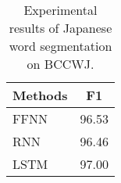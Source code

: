 \documentclass[11pt,letterpaper]{article}
\begin{document}
 \begin{table}[t]     
 
                                                                                                                                                                                                                                                                                                 
 \begin{center}                                                                                                                                                                                                                                                                                                             
\caption{Experimental results of Japanese word segmentation on BCCWJ.}                                                                                                                                                                                                                                                                                 
\label{state_result}                                                                                                                                                                                                                                                                                                              
 \begin{tabular}{p{64mm}| r}                                                                                                                                  
  \toprule                                                                                                                                                    
        \multicolumn{1}{c|}{Methods} & \multicolumn{1}{c}{F1}\\                                                                                             
        \midrule                  
      FFNN  & 96.53 \\                                                                                                                                     
      RNN  &  96.46 \\                                                                                                                               
      LSTM  & 97.00 \\                                                                                                                                                                                                                                                                                          

\end{tabular}
\end{center}
\end{table}
\end{document}
